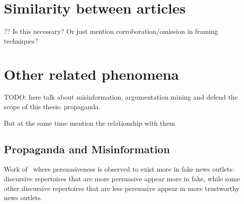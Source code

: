 













\section{Similarity between articles}
\label{sec:lit_relationships}

?? Is this necessary? Or just mention corroboration/omission in framing techniques?

\section{Other related phenomena}

TODO: here talk about misinformation, argumentation mining and defend the scope of this thesis: propaganda.

But at the same time mention the relationship with them

\subsection{Propaganda and Misinformation}

Work of~\citet{orrumachine} where persuasiveness is observed to exist more in fake news outlets: discursive repertoires that are more persuasive appear more in fake, while some other discursive repertoires that are less persuasive appear in more trustworthy news outlets.




